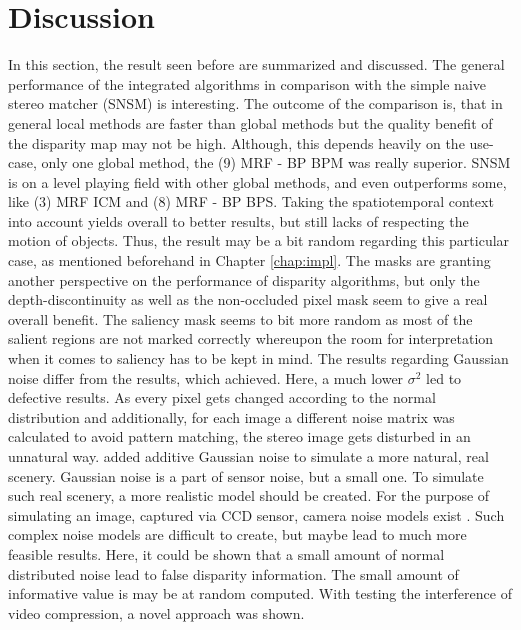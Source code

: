 \section{Discussion}

In this section, the result seen before are summarized and discussed.
The general performance of the integrated algorithms in comparison with the simple naive stereo matcher (SNSM) is interesting.
The outcome of the comparison is, that in general local methods are faster than global methods but the quality benefit of the disparity map may not be high.
Although, this depends heavily on the use-case, only one global method, the (9) MRF - BP BPM was really superior.
SNSM is on a level playing field with other global methods, and even outperforms some, like (3) MRF ICM and (8) MRF - BP BPS.
Taking the spatiotemporal context into account yields overall to better results, but still lacks of respecting the motion of objects.
Thus, the result may be a bit random regarding this particular case, as mentioned beforehand in Chapter \ref{chap:impl}.
The masks are granting another perspective on the performance of disparity algorithms, but only the depth-discontinuity as well as the non-occluded pixel mask seem to give a real overall benefit.
The saliency mask seems to bit more random as most of the salient regions are not marked correctly whereupon the room for interpretation when it comes to saliency has to be kept in mind.
\newline\newline\noindent The results regarding Gaussian noise differ from the results, which \citeauthor{richardt2010real} \citep{richardt2010real} achieved.
Here, a much lower $\sigma^2$ led to defective results.
As every pixel gets changed according to the normal distribution and additionally, for each image a different noise matrix was calculated to avoid pattern matching, the stereo image gets disturbed in an unnatural way.
\citeauthor{richardt2010real} added additive Gaussian noise to simulate a more natural, real scenery.
Gaussian noise is a part of sensor noise, but a small one.
To simulate such real scenery, a more realistic model should be created.
For the purpose of simulating an image, captured via CCD sensor, camera noise models exist \citep{liu2006noise}.
Such complex noise models are difficult to create, but maybe lead to much more feasible results.
Here, it could be shown that a small amount of normal distributed noise lead to false disparity information.
The small amount of informative value is may be at random computed.
\newline\newline\noindent With testing the interference of video compression, a novel approach was shown.
